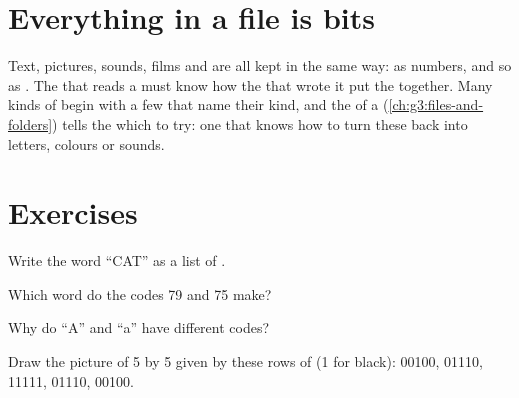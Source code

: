\section{Everything in a file is bits}

Text, pictures, sounds, films and  are all kept in the same way: as
numbers, and so as . The  that reads a  must know how the
 that wrote it put the  together. Many kinds of  begin with a
few  that name their kind, and the  of a 
(\cref{ch:g3:files-and-folders}) tells the  which  to try: one
that knows how to turn these  back into letters, colours or sounds.

\section{Exercises}

\begin{exercise}[$\star$]\label{exo:g5:text-pictures-sound-as-numbers:1}
Write the word ``CAT'' as a list of .
\end{exercise}

\begin{exercise}[$\star$]\label{exo:g5:text-pictures-sound-as-numbers:2}
Which word do the codes 79 and 75 make?
\end{exercise}

\begin{exercise}[$\star$]\label{exo:g5:text-pictures-sound-as-numbers:3}
Why do ``A'' and ``a'' have different codes?
\end{exercise}

\begin{exercise}[$\star$]\label{exo:g5:text-pictures-sound-as-numbers:4}
Draw the picture of 5 by 5  given by these rows of  (1 for black):
00100, 01110, 11111, 01110, 00100.
\end{exercise}

